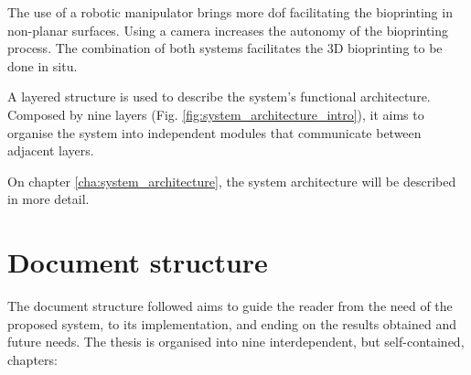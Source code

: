The use of a robotic manipulator brings more \gls{dof} facilitating the bioprinting in non-planar surfaces. Using a camera increases the autonomy of the bioprinting process. The combination of both systems facilitates the 3D bioprinting to be done in situ.

A layered structure is used to describe the system's functional architecture. Composed by nine layers (Fig. \ref{fig:system_architecture_intro}), it aims to organise the system into independent modules that communicate between adjacent layers.

On chapter \ref{cha:system_architecture}, the system architecture will be described in more detail.


\section{Document structure}
\label{sec:document_structure}

The document structure followed aims to guide the reader from the need of the proposed system, to its implementation, and ending on the results obtained and future needs. The thesis is organised into nine interdependent, but self-contained, chapters:

